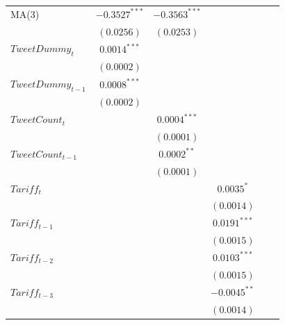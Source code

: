 \documentclass[
]{article}
\begin{document}
{\begin{appendix}
\begin{table}
\begin{center}
\begin{tabular}{l c c c c c}
MA(3)              & $-0.3527^{***}$ & $-0.3563^{***}$ &                 &                 &                 \\
                   & $(0.0256)$      & $(0.0253)$      &                 &                 &                 \\
$TweetDummy_{t}$   & $0.0014^{***}$  &                 &                 &                 &                 \\
                   & $(0.0002)$      &                 &                 &                 &                 \\
$TweetDummy_{t-1}$ & $0.0008^{***}$  &                 &                 &                 &                 \\
                   & $(0.0002)$      &                 &                 &                 &                 \\
$TweetCount_{t}$   &                 & $0.0004^{***}$  &                 &                 &                 \\
                   &                 & $(0.0001)$      &                 &                 &                 \\
$TweetCount_{t-1}$ &                 & $0.0002^{**}$   &                 &                 &                 \\
                   &                 & $(0.0001)$      &                 &                 &                 \\
$Tariff_{t}$       &                 &                 & $0.0035^{*}$    &                 &                 \\
                   &                 &                 & $(0.0014)$      &                 &                 \\
$Tariff_{t-1}$     &                 &                 & $0.0191^{***}$  &                 &                 \\
                   &                 &                 & $(0.0015)$      &                 &                 \\
$Tariff_{t-2}$     &                 &                 & $0.0103^{***}$  &                 &                 \\
                   &                 &                 & $(0.0015)$      &                 &                 \\
$Tariff_{t-3}$     &                 &                 & $-0.0045^{**}$  &                 &                 \\
                   &                 &                 & $(0.0014)$      &                 &                 \\

\end{tabular}
\end{center}
\end{table}
\end{appendix}}
\end{document}
